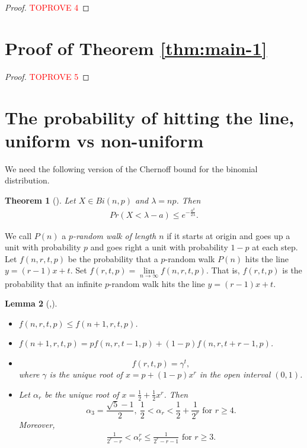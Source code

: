 \documentclass[11pt,a4paper]{article}
\newtheorem{thm}{Theorem}[section]
\newtheorem{lem}[thm]{Lemma}
\newtheorem{false statement}{False statement}
\theoremstyle{definition}
\begin{document}
\begin{proof}\textcolor{red}{TOPROVE 4}\end{proof}

\section{Proof of Theorem \ref{thm:main-1}}



\begin{proof}\textcolor{red}{TOPROVE 5}\end{proof}





\section{The probability of hitting the line, uniform vs non-uniform}


We need the following version of the Chernoff bound for the binomial distribution.

\begin{thm}[\cite{janson2011random}]
Let $X\in Bi(n,p)$ and $\lambda=np$. Then
\begin{align}\label{chernoff-small}
Pr(X< \lambda-a) \leq e^{-\frac{a^2}{2\lambda}}.
\end{align}
\end{thm}

We call $P(n)$ a {\it $p$-random walk of length $n$} if it starts at origin and goes up a unit with probability $p$ and goes right a unit with probability $1-p$ at each step.  Let $f(n,r,t,p)$ be the probability that a $p$-random walk $P(n)$ hits the line $y=(r-1)x+t$.  Set $f(r,t,p) =\lim\limits_{n\rightarrow \infty} f(n,r,t,p)$. That is, $f(r,t,p)$ is the probability that an infinite $p$-random walk hits the line $y=(r-1)x+t$.



\begin{lem}[\cite{F87},\cite{F91}]\label{lem-key1}
\begin{itemize}
  \item[(i)] $f(n,r,t,p)\leq f(n+1,r,t,p)$.
  \item[(ii)] $f(n+1,r,t,p) = p f(n,r,t-1,p) + (1-p) f(n,r,t+r-1,p)$.
  \item[(iii)]
  \[
      f(r,t,p)=\gamma^t,
  \]
where $\gamma$ is the unique root of  $x = p + (1-p) x^{r}$ in the open interval $(0,1)$.
  \item[(iv)] Let $\alpha_r$ be the unique root of  $x = \frac{1}{2}+ \frac{1}{2}x^{r}$. Then
  \[
      \alpha_3=\frac{\sqrt{5}-1}{2},\ \frac{1}{2}<\alpha_r< \frac{1}{2}+\frac{1}{2^r} \mbox{ for } r\geq 4.
  \]
  Moreover,
  \begin{align}\label{ineq-frankl}
  \frac{1}{2^r-r}<\alpha_r^r\leq \frac{1}{2^r-r-1} \mbox{ for } r\geq 3.
  \end{align}
\end{itemize}
\end{lem}
\end{document}
